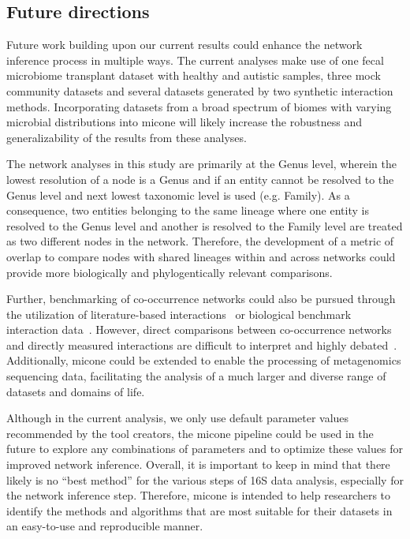   \subsection*{Future directions}

  Future work building upon our current results could enhance the network inference process in multiple ways.
  The current analyses make use of one fecal microbiome transplant dataset with healthy and autistic samples, three mock community datasets and several datasets generated by two synthetic interaction methods.
  Incorporating datasets from a broad spectrum of biomes with varying microbial distributions into \ac{micone} will likely increase the robustness and generalizability of the results from these analyses.

  The network analyses in this study are primarily at the Genus level, wherein the lowest resolution of a node is a Genus and if an entity cannot be resolved to the Genus level and next lowest taxonomic level is used (e.g. Family).
  As a consequence, two entities belonging to the same lineage where one entity is resolved to the Genus level and another is resolved to the Family level are treated as two different nodes in the network.
  Therefore, the development of a metric of overlap to compare nodes with shared lineages within and across networks could provide more biologically and phylogentically relevant comparisons.

  Further, benchmarking of co-occurrence networks could also be pursued through the utilization of literature-based interactions~\cite{lima-mendezDeterminantsCommunityStructure2015a} or biological benchmark interaction data~\cite{sungGlobalMetabolicInteraction2017a}.
  However, direct comparisons between co-occurrence networks and directly measured interactions are difficult to interpret and highly debated~\cite{hiranoDifficultyInferringMicrobial2019,gobernaCautionaryNotesUse2022}.
  Additionally, \ac{micone} could be extended to enable the processing of metagenomics sequencing data, facilitating the analysis of a much larger and diverse range of datasets and domains of life.

  Although in the current analysis, we only use default parameter values recommended by the tool creators, the \ac{micone} pipeline could be used in the future to explore any combinations of parameters and to optimize these values for improved network inference.
  Overall, it is important to keep in mind that there likely is no ``best method'' for the various steps of 16S data analysis, especially for the network inference step.
  Therefore, \ac{micone} is intended to help researchers to identify the methods and algorithms that are most suitable for their datasets in an easy-to-use and reproducible manner.

